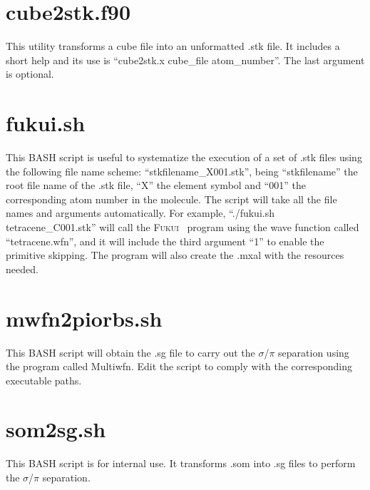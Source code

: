 \documentclass[a4paper,11pt,openany]{memoir}
\newcommand\programa{\textsc{Fukui}}
\begin{document}
\section{cube2stk.f90}
This utility transforms a cube file into an unformatted .stk file. It includes a short help and its use is ``cube2stk.x cube\_file atom\_number''. The last argument is optional.

\section{fukui.sh}
This BASH script is useful to systematize the execution of a set of .stk files using the following file name scheme: ``stkfilename\_X001.stk'', being ``stkfilename'' the root file name of the .stk file, ``X'' the element symbol and ``001'' the corresponding atom number in the molecule. The script will take all the file names and arguments automatically. For example, ``./fukui.sh tetracene\_C001.stk'' will call the \programa~ program using the wave function called ``tetracene.wfn'', and it will include the third argument ``1'' to enable the primitive skipping. The program will also create the .mxal with the resources needed.

\section{mwfn2piorbs.sh}
This BASH script will obtain the .sg file to carry out the $\sigma$/$\pi$ separation using the program called Multiwfn. Edit the script to comply with the corresponding executable paths.

\section{som2sg.sh}
This BASH script is for internal use. It transforms .som into .sg files to perform the $\sigma$/$\pi$ separation.

%


\printbibliography
\end{document}
